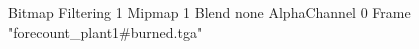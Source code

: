 {Bitmap
	{Filtering 1}
	{Mipmap 1}
	{Blend none}
	{AlphaChannel 0}
	{Frame "forecount_plant1#burned.tga"}
}
